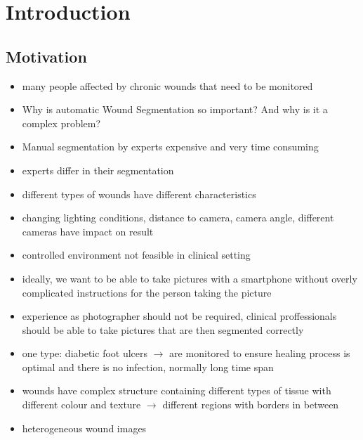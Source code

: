 \section{Introduction}

\subsection{Motivation}

\begin{itemize}
	\item many people affected by chronic wounds that need to be monitored
	\item Why is automatic Wound Segmentation so important? And why is it a complex problem?
	\item Manual segmentation by experts expensive and very time consuming
	\item experts differ in their segmentation
	\item different types of wounds have different characteristics
	\item changing lighting conditions, distance to camera, camera angle, different cameras have impact on result
	\item controlled environment not feasible in clinical setting
	\item ideally, we want to be able to take pictures with a smartphone without overly complicated instructions for the person taking the picture
	\item experience as photographer should not be required, clinical proffessionals should be able to take pictures that are then segmented correctly
\end{itemize}

\begin{itemize}
	\item one type: diabetic foot ulcers $\rightarrow$ are monitored to ensure healing process is optimal and there is no infection, normally long time span \cite{DFUC2022}
\end{itemize}

\begin{itemize}
	\item wounds have complex structure containing different types of tissue with different colour and texture $\rightarrow$ different regions with borders in between \cite{AhmadFauzi2015}
	\item heterogeneous wound images
\end{itemize}


